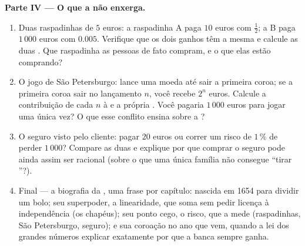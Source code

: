 \begin{problem}
\medskip
\noindent\textbf{Parte IV --- O que a  não enxerga.}
\begin{enumerate}[resume]
  \item Duas raspadinhas de $5$ euros: a raspadinha A paga $10$
        euros com  $\frac12$; a B paga $1\,000$
        euros com  $0.005$. Verifique que os dois
        ganhos têm a mesma  e calcule as duas
        . Que raspadinha as pessoas de fato compram, e
        o que elas estão comprando?
  \item O jogo de São Petersburgo: lance uma moeda até sair a
        primeira coroa; se a primeira coroa sair no lançamento
        $n$, você recebe $2^n$ euros. Calcule a contribuição de
        cada $n$ à  e a própria . Você pagaria
        $1\,000$ euros para jogar uma única vez? O que esse
        conflito ensina sobre a ?
  \item O seguro visto pelo cliente: pagar $20$ euros ou correr
        um risco de $1\,\%$ de perder $1\,000$? Compare as duas
         e explique por que comprar o seguro pode ainda
        assim ser racional (sobre o que uma única família não
        consegue ``tirar ''?).
  \item Final --- a biografia da , uma frase por
        capítulo: nascida em 1654 para dividir um bolo; seu
        superpoder, a linearidade, que soma  sem pedir
        licença à independência (os chapéus); seu ponto cego, o
        risco, que a  mede (raspadinhas, São
        Petersburgo, seguro); e sua coroação no ano que vem,
        quando a lei dos grandes números explicar exatamente por
        que a banca sempre ganha.
\end{enumerate}
\end{problem}
